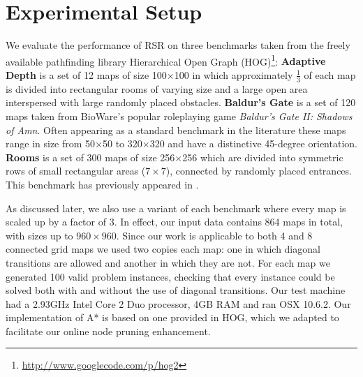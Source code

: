 \section{Experimental Setup}
We evaluate the performance of RSR on three benchmarks taken from the freely
available pathfinding library Hierarchical Open Graph
(HOG)\footnote{\url{http://www.googlecode.com/p/hog2}}: {\textbf{Adaptive Depth}
is a set of 12 maps of size 100$\times$100 in which approximately $\frac{1}{3}$
of each map is divided into rectangular rooms of varying size and a large
open area interspersed with large randomly placed obstacles.} {\textbf{Baldur's
Gate} is a set of 120 maps taken from BioWare's popular roleplaying game
\emph{Baldur's Gate II: Shadows of Amn}.  Often appearing as a standard
benchmark in the literature \cite{bjornsson06,harabor10,pochter10} these maps
range in size from 50$\times$50 to 320$\times$320 and have a distinctive
45-degree orientation.} {\textbf{Rooms} is a set of 300 maps of size
256$\times$256 which are divided into symmetric rows of small rectangular areas
($7\times7$), connected by randomly placed entrances. This benchmark has
previously appeared in \cite{pochter10}.}

As discussed later, we also use a variant of each benchmark where every map is
scaled up by a factor of 3. In effect, our input data contains 864 maps in
total, with sizes up to $960\times960$.  Since our work is applicable to both 4
and 8 connected grid maps we used two copies each map: one in which diagonal
transitions are allowed and another in which they are not.  For each map we
generated 100 valid problem instances, checking that every instance could be
solved both with and without the use of diagonal transitions.  Our test machine
had a 2.93GHz Intel Core 2 Duo processor, 4GB RAM and ran OSX 10.6.2.  Our
implementation of A* is based on one provided in HOG, which we adapted to
facilitate our online node pruning enhancement.
